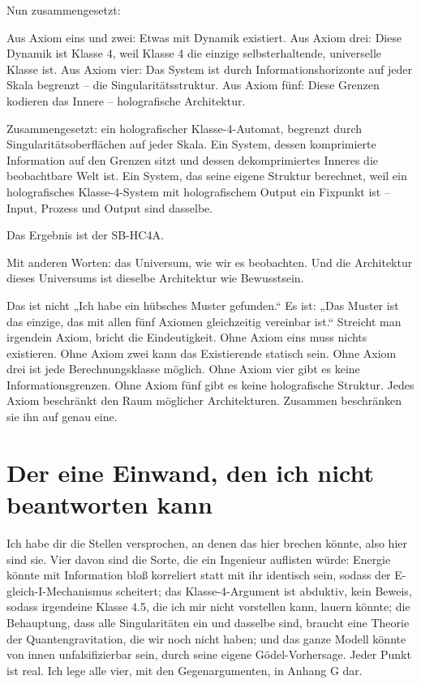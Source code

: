\documentclass[11pt, twoside, openright]{book}
\begin{document}
Nun zusammengesetzt:

Aus Axiom eins und zwei: Etwas mit Dynamik existiert. Aus Axiom drei: Diese Dynamik ist Klasse 4, weil Klasse 4 die einzige selbsterhaltende, universelle Klasse ist. Aus Axiom vier: Das System ist durch Informationshorizonte auf jeder Skala begrenzt -- die Singularitätsstruktur. Aus Axiom fünf: Diese Grenzen kodieren das Innere -- holografische Architektur.

Zusammengesetzt: ein holografischer Klasse-4-Automat, begrenzt durch Singularitätsoberflächen auf jeder Skala. Ein System, dessen komprimierte Information auf den Grenzen sitzt und dessen dekomprimiertes Inneres die beobachtbare Welt ist. Ein System, das seine eigene Struktur berechnet, weil ein holografisches Klasse-4-System mit holografischem Output ein Fixpunkt ist -- Input, Prozess und Output sind dasselbe.

Das Ergebnis ist der SB-HC4A.

Mit anderen Worten: das Universum, wie wir es beobachten. Und die Architektur dieses Universums ist dieselbe Architektur wie Bewusstsein.

Das ist nicht „Ich habe ein hübsches Muster gefunden.“ Es ist: „Das Muster ist das einzige, das mit allen fünf Axiomen gleichzeitig vereinbar ist.“ Streicht man irgendein Axiom, bricht die Eindeutigkeit. Ohne Axiom eins muss nichts existieren. Ohne Axiom zwei kann das Existierende statisch sein. Ohne Axiom drei ist jede Berechnungsklasse möglich. Ohne Axiom vier gibt es keine Informationsgrenzen. Ohne Axiom fünf gibt es keine holografische Struktur. Jedes Axiom beschränkt den Raum möglicher Architekturen. Zusammen beschränken sie ihn auf genau eine.

\section*{Der eine Einwand, den ich nicht beantworten kann}

Ich habe dir die Stellen versprochen, an denen das hier brechen könnte, also hier sind sie. Vier davon sind die Sorte, die ein Ingenieur auflisten würde: Energie könnte mit Information bloß korreliert statt mit ihr identisch sein, sodass der E-gleich-I-Mechanismus scheitert; das Klasse-4-Argument ist abduktiv, kein Beweis, sodass irgendeine Klasse 4.5, die ich mir nicht vorstellen kann, lauern könnte; die Behauptung, dass alle Singularitäten ein und dasselbe sind, braucht eine Theorie der Quantengravitation, die wir noch nicht haben; und das ganze Modell könnte von innen unfalsifizierbar sein, durch seine eigene Gödel-Vorhersage. Jeder Punkt ist real. Ich lege alle vier, mit den Gegenargumenten, in Anhang G dar.
\end{document}
